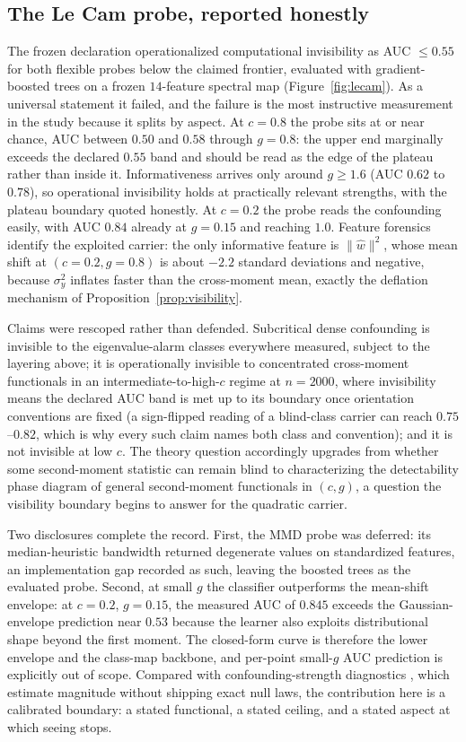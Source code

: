 \subsection{The Le Cam probe, reported honestly}

The frozen declaration operationalized computational invisibility as AUC $\le 0.55$ for both flexible probes below the claimed frontier, evaluated with gradient-boosted trees on a frozen $14$-feature spectral map (Figure~\ref{fig:lecam}). As a universal statement it failed, and the failure is the most instructive measurement in the study because it splits by aspect. At $c=0.8$ the probe sits at or near chance, AUC between $0.50$ and $0.58$ through $g=0.8$: the upper end marginally exceeds the declared $0.55$ band and should be read as the edge of the plateau rather than inside it. Informativeness arrives only around $g\ge 1.6$ (AUC $0.62$ to $0.78$), so operational invisibility holds at practically relevant strengths, with the plateau boundary quoted honestly. At $c=0.2$ the probe reads the confounding easily, with AUC $0.84$ already at $g=0.15$ and reaching $1.0$. Feature forensics identify the exploited carrier: the only informative feature is $\|\hat w\|^2$, whose mean shift at $(c=0.2,g=0.8)$ is about $-2.2$ standard deviations and negative, because $\sigma_y^2$ inflates faster than the cross-moment mean, exactly the deflation mechanism of Proposition~\ref{prop:visibility}.

Claims were rescoped rather than defended. Subcritical dense confounding is invisible to the eigenvalue-alarm classes everywhere measured, subject to the layering above; it is operationally invisible to concentrated cross-moment functionals in an intermediate-to-high-$c$ regime at $n=2000$, where invisibility means the declared AUC band is met up to its boundary once orientation conventions are fixed (a sign-flipped reading of a blind-class carrier can reach $0.75$--$0.82$, which is why every such claim names both class and convention); and it is not invisible at low $c$. The theory question accordingly upgrades from whether some second-moment statistic can remain blind to characterizing the detectability phase diagram of general second-moment functionals in $(c,g)$, a question the visibility boundary begins to answer for the quadratic carrier.

Two disclosures complete the record. First, the MMD probe was deferred: its median-heuristic bandwidth returned degenerate values on standardized features, an implementation gap recorded as such, leaving the boosted trees as the evaluated probe. Second, at small $g$ the classifier outperforms the mean-shift envelope: at $c=0.2$, $g=0.15$, the measured AUC of $0.845$ exceeds the Gaussian-envelope prediction near $0.53$ because the learner also exploits distributional shape beyond the first moment. The closed-form curve is therefore the lower envelope and the class-map backbone, and per-point small-$g$ AUC prediction is explicitly out of scope. Compared with confounding-strength diagnostics \citep{janzing2018detecting,rendsburg2024consistent}, which estimate magnitude without shipping exact null laws, the contribution here is a calibrated boundary: a stated functional, a stated ceiling, and a stated aspect at which seeing stops.

